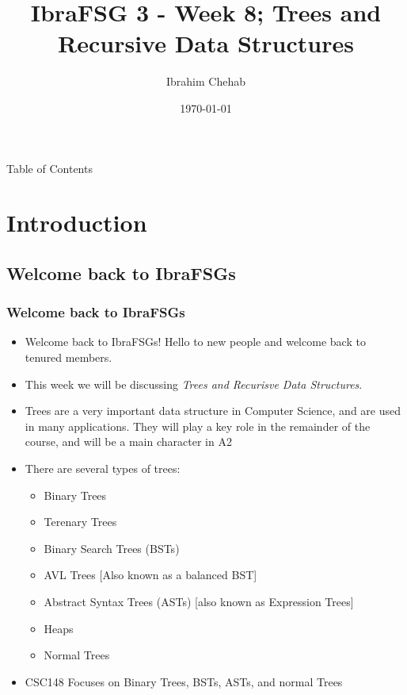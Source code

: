 \documentclass[hyperref={colorlinks,citecolor=blue,linkcolor=blue,urlcolor=blue}, aspectratio=1610]{beamer}
\title[IbraFSG 4: Trees and Recursion]{IbraFSG\texttrademark{} 3 - Week 8; Trees and Recursive Data Structures}
\author{Ibrahim Chehab}
\institute{UTM RGASC}
\date{\today}
\begin{document}
\begin{frame}
  \titlepage
\end{frame}

\begin{frame}{Table of Contents}
  \tableofcontents
\end{frame}

\section{Introduction}

\subsection{Welcome back to IbraFSGs\texttrademark{}}
\begin{frame}
  \frametitle{Welcome back to IbraFSGs\texttrademark{}}
  \begin{itemize}
  \item Welcome back to IbraFSGs\texttrademark{}! Hello to new people and welcome back to tenured members.
  \item This week we will be discussing \textit{Trees and Recurisve Data Structures}.
  \item Trees are a very important data structure in Computer Science, and are used in many applications. They will play a key role in the remainder of the course, and will be a main character in A2
  \item There are several types of trees:
  \begin{itemize}
    \item Binary Trees
    \item Terenary Trees
    \item Binary Search Trees (BSTs)
    \item AVL Trees [Also known as a balanced BST]
    \item Abstract Syntax Trees (ASTs) [also known as Expression Trees]
    \item Heaps
    \item Normal Trees
  \end{itemize}
  \item CSC148 Focuses on Binary Trees, BSTs, ASTs, and normal Trees
\end{itemize}
\end{frame}
\end{document}
